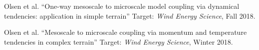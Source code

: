 \documentclass[12pt,letterpaper]{report}
\begin{document}
\begin{tablist}

\item[\the\year] \tab Olsen et al. \enquote{One-way mesoscale to microscale model coupling via dynamical tendencies: application in simple terrain} Target: \textit{Wind Energy Science}, Fall 2018.

\item[\the\year] \tab Olsen et al. \enquote{Mesoscale to microscale coupling via momentum and temperature tendencies in complex terrain} Target: \textit{Wind Energy Science}, Winter 2018.

\end{tablist}










\end{document}
